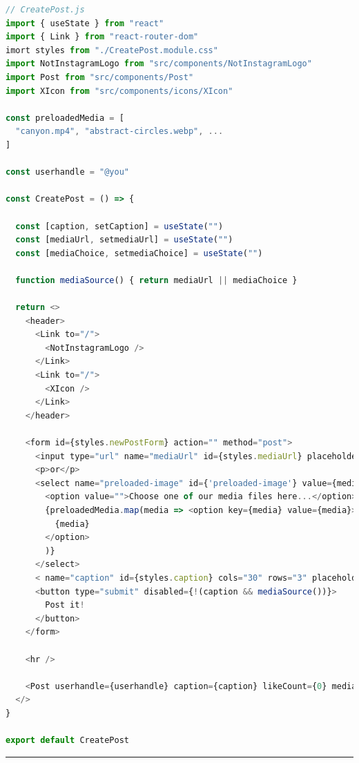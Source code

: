 \documentclass[a4paper, 12pt]{article}
\begin{document}
\begin{lstlisting}[caption=Create page in React, label={lst:React:Create}, language=JavaScript]
// CreatePost.js
import { useState } from "react"
import { Link } from "react-router-dom"
imort styles from "./CreatePost.module.css"
import NotInstagramLogo from "src/components/NotInstagramLogo"
import Post from "src/components/Post"
import XIcon from "src/components/icons/XIcon"

const preloadedMedia = [
  "canyon.mp4", "abstract-circles.webp", ...
]

const userhandle = "@you"

const CreatePost = () => {

  const [caption, setCaption] = useState("")
  const [mediaUrl, setmediaUrl] = useState("")
  const [mediaChoice, setmediaChoice] = useState("")

  function mediaSource() { return mediaUrl || mediaChoice }

  return <>
    <header>
      <Link to="/">
        <NotInstagramLogo />
      </Link>
      <Link to="/">
        <XIcon />
      </Link>
    </header>

    <form id={styles.newPostForm} action="" method="post">
      <input type="url" name="mediaUrl" id={styles.mediaUrl} placeholder="Insert your media URL here..." value={mediaUrl} onChange={(event) => setmediaUrl(event.target.value)} />
      <p>or</p>
      <select name="preloaded-image" id={'preloaded-image'} value={mediaChoice} onChange={(event) => setmediaChoice(event.target.value)}>
        <option value="">Choose one of our media files here...</option>
        {preloadedMedia.map(media => <option key={media} value={media}>
          {media}
        </option>
        )}
      </select>
      < name="caption" id={styles.caption} cols="30" rows="3" placeholder="Type your caption here" value={caption} onChange={(event) => setCaption(event.target.value)} />
      <button type="submit" disabled={!(caption && mediaSource())}>
        Post it!
      </button>
    </form>

    <hr />

    <Post userhandle={userhandle} caption={caption} likeCount={0} mediaSource={mediaSource()} hideActionIcons={true} />
  </>
}

export default CreatePost
\end{lstlisting}

\vspace{0.5cm} \hrule \vspace{0.5cm}
\end{document}
